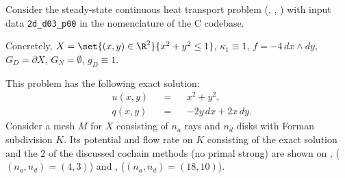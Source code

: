 \begin{example}
  \label{cmc/diffusion/continuous/steady_state/examples/2d_d03_p00-example}
  Consider the steady-state continuous heat transport problem
  (,
   ,
   )
  with input data \verb|2d_d03_p00| in the nomenclature of the C codebase.

  Concretely,
    $X = \set{(x, y) \in \R^2}{x^2 + y^2 \leq 1}$,
    $\kappa_1 \equiv 1$,
    $f = - 4 \, d x \wedge d y$,
    $G_D = \partial X$,
    $G_N = \emptyset$,
    $g_D \equiv 1$.

  This problem has the following exact solution:
  \begin{subequations}
    \begin{alignat}{3}
      & u(x, y) && = && x^2 + y^2, \\
      & q(x, y) && = && -2 y \, d x + 2 x \, d y.
    \end{alignat}
  \end{subequations}
  Consider a mesh $M$ for $X$ consisting of $n_a$ rays and $n_d$ disks
  with Forman subdivision $K$.
  Its potential and flow rate on $K$ consisting of the exact solution and the
  $2$ of the discussed cochain methods (no primal strong) are shown on
  ,
  ($(n_a, n_d) = (4, 3)$)
  and
  ,
  ($(n_a, n_d) = (18, 10)$).
\end{example}
